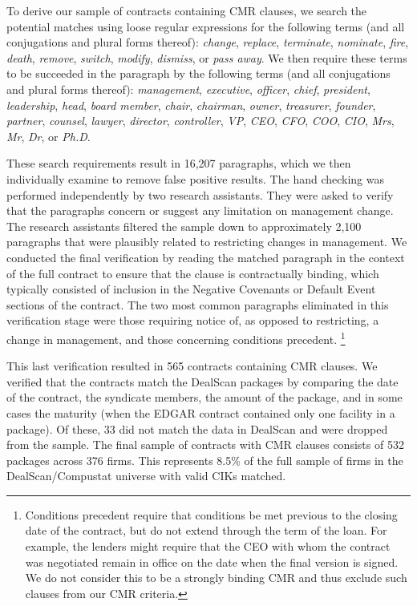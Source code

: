 \documentclass[12pt]{article}
\begin{document}
\begin{appendices}
To derive our sample of contracts containing CMR clauses, we search the potential matches using loose regular expressions for the following terms (and all conjugations and plural forms thereof): \textit{change}, \textit{replace}, \textit{terminate}, \textit{nominate}, \textit{fire}, \textit{death}, \textit{remove}, \textit{switch}, \textit{modify}, \textit{dismiss}, or \textit{pass away}.
We then require these terms to be succeeded in the paragraph by the following terms (and all conjugations and plural forms thereof): \textit{management}, \textit{executive}, \textit{officer}, \textit{chief}, \textit{president}, \textit{leadership}, \textit{head}, \textit{board member}, \textit{chair}, \textit{chairman}, \textit{owner}, \textit{treasurer}, \textit{founder}, \textit{partner}, \textit{counsel}, \textit{lawyer}, \textit{director}, \textit{controller}, \textit{VP}, \textit{CEO}, \textit{CFO}, \textit{COO}, \textit{CIO}, \textit{Mrs}, \textit{Mr}, \textit{Dr}, or \textit{Ph.D}.


These search requirements result in 16,207 paragraphs, which we then individually examine to remove false positive results.
The hand checking was performed independently by two research assistants.
They were asked to verify that the paragraphs concern or suggest any limitation on management change.
The research assistants filtered the sample down to approximately 2,100 paragraphs that were plausibly related to restricting changes in management.
We conducted the final verification by reading the matched paragraph in the context of the full contract to ensure that the clause is contractually binding, which typically consisted of inclusion in the Negative Covenants or Default Event sections of the contract.
The two most common paragraphs eliminated in this verification stage were those requiring notice of, as opposed to restricting, a change in management, and those concerning conditions precedent.%
    \footnote{Conditions precedent require that conditions be met previous to the closing date of the contract, but do not extend through the term of the loan. For example, the lenders might require that the CEO with whom the contract was negotiated remain in office on the date when the final version is signed. We do not consider this to be a strongly binding CMR and thus exclude such clauses from our CMR criteria.}


This last verification resulted in 565 contracts containing CMR clauses.
We verified that the contracts match the DealScan packages by comparing the date of the contract, the syndicate members, the amount of the package, and in some cases the maturity (when the EDGAR contract contained only one facility in a package).
Of these, 33 did not match the data in DealScan and were dropped from the sample.
The final sample of contracts with CMR clauses consists of 532 packages across 376 firms.
This represents 8.5\% of the full sample of firms in the DealScan/Compustat universe with valid CIKs matched.




\end{appendices}
\end{document}
